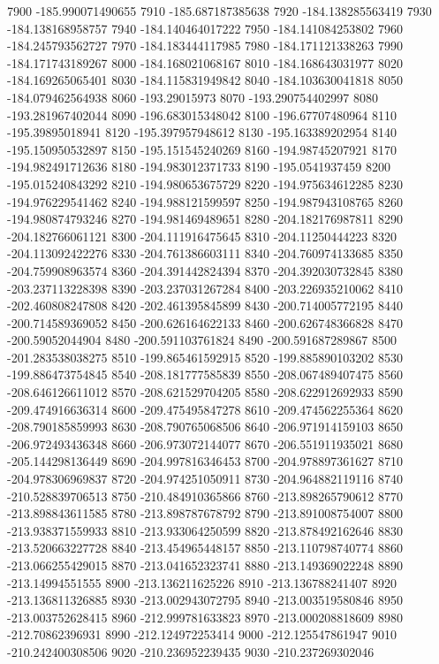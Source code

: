 {7900 -185.990071490655
7910 -185.687187385638
7920 -184.138285563419
7930 -184.138168958757
7940 -184.140464017222
7950 -184.141084253802
7960 -184.245793562727
7970 -184.183444117985
7980 -184.171121338263
7990 -184.171743189267
8000 -184.168021068167
8010 -184.168643031977
8020 -184.169265065401
8030 -184.115831949842
8040 -184.103630041818
8050 -184.079462564938
8060 -193.29015973
8070 -193.290754402997
8080 -193.281967402044
8090 -196.683015348042
8100 -196.67707480964
8110 -195.39895018941
8120 -195.397957948612
8130 -195.163389202954
8140 -195.150950532897
8150 -195.151545240269
8160 -194.98745207921
8170 -194.982491712636
8180 -194.983012371733
8190 -195.0541937459
8200 -195.015240843292
8210 -194.980653675729
8220 -194.975634612285
8230 -194.976229541462
8240 -194.988121599597
8250 -194.987943108765
8260 -194.980874793246
8270 -194.981469489651
8280 -204.182176987811
8290 -204.182766061121
8300 -204.111916475645
8310 -204.11250444223
8320 -204.113092422276
8330 -204.761386603111
8340 -204.760974133685
8350 -204.759908963574
8360 -204.391442824394
8370 -204.392030732845
8380 -203.237113228398
8390 -203.237031267284
8400 -203.226935210062
8410 -202.460808247808
8420 -202.461395845899
8430 -200.714005772195
8440 -200.714589369052
8450 -200.626164622133
8460 -200.626748366828
8470 -200.59052044904
8480 -200.591103761824
8490 -200.591687289867
8500 -201.283538038275
8510 -199.865461592915
8520 -199.885890103202
8530 -199.886473754845
8540 -208.181777585839
8550 -208.067489407475
8560 -208.646126611012
8570 -208.621529704205
8580 -208.622912692933
8590 -209.474916636314
8600 -209.475495847278
8610 -209.474562255364
8620 -208.790185859993
8630 -208.790765068506
8640 -206.971914159103
8650 -206.972493436348
8660 -206.973072144077
8670 -206.551911935021
8680 -205.144298136449
8690 -204.997816346453
8700 -204.978897361627
8710 -204.978306969837
8720 -204.974251050911
8730 -204.964882119116
8740 -210.528839706513
8750 -210.484910365866
8760 -213.898265790612
8770 -213.898843611585
8780 -213.898787678792
8790 -213.891008754007
8800 -213.938371559933
8810 -213.933064250599
8820 -213.878492162646
8830 -213.520663227728
8840 -213.454965448157
8850 -213.110798740774
8860 -213.066255429015
8870 -213.041652323741
8880 -213.149369022248
8890 -213.14994551555
8900 -213.136211625226
8910 -213.136788241407
8920 -213.136811326885
8930 -213.002943072795
8940 -213.003519580846
8950 -213.003752628415
8960 -212.999781633823
8970 -213.000208818609
8980 -212.70862396931
8990 -212.124972253414
9000 -212.125547861947
9010 -210.242400308506
9020 -210.236952239435
9030 -210.237269302046
}
